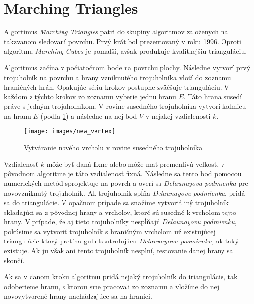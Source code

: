 \section{Marching Triangles}

\label{kap:marching_triangles}

Algortimus \textit{Marching Triangles} \cite{hilton1996marching} patrí do skupiny algoritmov založených na takzvanom 
sledovaní povrchu. Prvý krát bol prezentovaný v roku 1996. Oproti algoritmu \textit{Marching Cubes} je pomalší, avšak
produkuje kvalitnejšiu trianguláciu. 

Algoritmus začína v počiatočnom bode na povrchu plochy. Následne vytvorí prvý trojuholník na povrchu a hrany vzniknutého 
trojuholníka vloží do zoznamu hraničných hrán. 
Opakujúc sériu krokov postupne zväčšuje trianguláciu. V každom z týchto krokov zo zoznamu vyberie jednu hranu $E$. 
Táto hrana susedí práve s jedným trojuholníkom. V rovine susedného trojuholníka vytvorí kolmicu na hranu $E$
(podľa \ref{obr:new_vertex}) a následne na nej bod $V$ v nejakej vzdialenosti $k$. 

\begin{figure}
    \centerline{\texttt{[image: images/new\_vertex]}}
    \caption[Vytváranie nového vrcholu $V$ v rovine susedného trojuholníka]{Vytváranie nového vrcholu v rovine susedného trojuholníka}
    \label{obr:new_vertex}
\end{figure}

Vzdialenosť $k$ môže byť daná fixne alebo môže mať premenlivú veľkosť, v pôvodnom algoritme je táto vzdialenosť fixná. 
Následne sa tento bod pomocou numerických metód sprojektuje na povrch a overí sa \textit{Delaunayova podmienka} pre novovzniknutý 
trojuholník. 
Ak trojuholník spĺňa \textit{Delaunayovu podmienku}, pridá sa do triangulácie. V opačnom prípade sa snažíme vytvoriť iný trojuholník 
skladajúci sa z pôvodnej hrany a vrcholov, ktoré sú susedné k vrcholom tejto hrany. V prípade, že aj tieto trojuholníky nespĺňajú 
\textit{Delaunayovu podmienku}, pokúsime sa vytvoriť trojuholník s hraničným vrcholom už existujúcej triangulácie ktorý pretína
guľu kontrolujúcu \textit{Delaunayovu podmienku}, ak taký existuje. Ak ju však ani tento trojuholník nesplní, testovanie danej hrany sa skončí.

Ak sa v danom kroku algoritmu pridá nejaký trojuholník do triangulácie, tak odoberieme hranu, s ktorou sme pracovali zo zoznamu a 
vložíme do nej novovytvorené hrany nachádzajúce sa na hranici.

